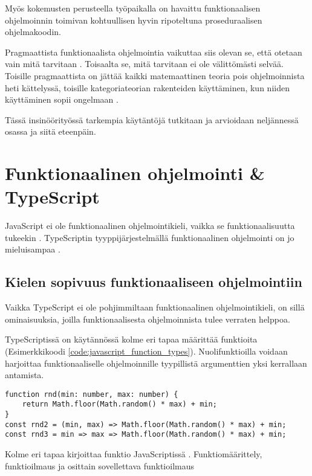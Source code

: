 Myös kokemusten perusteella työpaikalla on havaittu funktionaalisen ohjelmoinnin toimivan kohtuullisen hyvin ripoteltuna proseduraalisen ohjelmakoodin.

Pragmaattista funktionaalista ohjelmointia vaikuttaa siis olevan se, että otetaan vain mitä tarvitaan \cite{dear_functional_bros,martin2017pragmaticfp,cantarella_fp_haitat}. Toisaalta se, mitä tarvitaan ei ole välittömästi selvää. Toisille pragmaattista on jättää kaikki matemaattinen teoria pois ohjelmoinnista heti kättelyssä, toisille kategoriateorian rakenteiden käyttäminen, kun niiden käyttäminen sopii ongelmaan \cite{holvikari2021category,martin2017pragmaticfp}.

Tässä insinöörityössä tarkempia käytäntöjä tutkitaan ja arvioidaan neljännessä osassa ja siitä eteenpäin.

\section{Funktionaalinen ohjelmointi \& TypeScript}
JavaScript ei ole funktionaalinen ohjelmointikieli, vaikka se funktionaalisuutta tukeekin \cite{is_reduce_bad}. TypeScriptin tyyppijärjestelmällä funktionaalinen ohjelmointi on jo mieluisampaa \cite{holvikari2021category}.


\subsection{Kielen sopivuus funktionaaliseen ohjelmointiin}

Vaikka TypeScript ei ole pohjimmiltaan funktionaalinen ohjelmointikieli, on sillä ominaisuuksia, joilla funktionaalisesta ohjelmoinnista tulee verraten helppoa.

TypeScriptissä on käytännössä kolme eri tapaa määrittää funktioita (Esimerkkikoodi \ref{code:javascript_function_types}). Nuolifunktioilla voidaan harjoittaa funktionaaliselle ohjelmoinnille tyypillistä argumenttien yksi kerrallaan antamista.


\begin{code}
    \begin{verbatim}
function rnd(min: number, max: number) { 
	return Math.floor(Math.random() * max) + min;
}
const rnd2 = (min, max) => Math.floor(Math.random() * max) + min;
const rnd3 = min => max => Math.floor(Math.random() * max) + min;
\end{verbatim}
    \caption{Kolme eri tapaa kirjoittaa funktio JavaScriptissä \cite{okhravi-g-discussion}. Funktiomäärittely, funktioilmaus ja osittain sovellettava funktioilmaus}
    \label{code:javascript_function_types}
\end{code}

